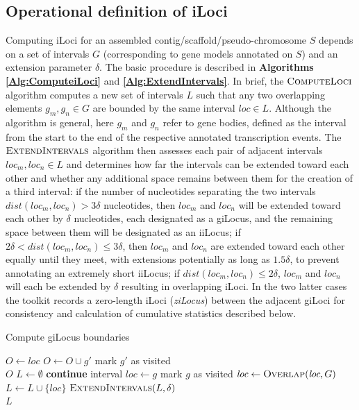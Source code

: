 \subsection{Operational definition of iLoci}
Computing iLoci for an assembled contig/scaffold/pseudo-chromosome $S$ depends on a set of intervals $G$ (corresponding to gene models annotated on $S$) and an extension parameter $\delta$.
The basic procedure is described in \textbf{Algorithms \ref{Alg:ComputeiLoci}} and \textbf{\ref{Alg:ExtendIntervals}}.
In brief, the $\textsc{ComputeLoci}$ algorithm computes a new set of intervals $L$ such that any two overlapping elements $g_m, g_n \in G$ are bounded by the same interval $loc \in L$.
Although the algorithm is general, here $g_m$ and $g_n$ refer to gene bodies, defined as the interval from the start to the end of the respective annotated transcription events.
The $\textsc{ExtendIntervals}$ algorithm then assesses each pair of adjacent intervals $loc_m, loc_n \in L$ and determines how far the intervals can be extended toward each other and whether any additional space remains between them for the creation of a third interval:
if the number of nucleotides separating the two intervals $dist(loc_m, loc_n) > 3 \delta$ nucleotides, then $loc_m$ and $loc_n$ will be extended toward each other by $\delta$ nucleotides, each designated as a giLocus, and the remaining space between them will be designated as an iiLocus;
if $2\delta < dist(loc_m, loc_n) \leq 3\delta$, then $loc_m$ and $loc_n$ are extended toward each other equally until they meet, with extensions potentially as long as $1.5\delta$, to prevent annotating an extremely short iiLocus;
if $dist(loc_m, loc_n) \leq 2\delta$, $loc_m$ and $loc_n$ will each be extended by $\delta$ resulting in overlapping iLoci.
In the two latter cases the toolkit records a zero-length iLoci (\textit{ziLocus}) between the adjacent giLoci for consistency and calculation of cumulative statistics described below.

\begin{algorithm}
\caption{Compute giLocus boundaries}
\label{Alg:ComputeiLoci}
\begin{algorithmic}[1]
\State $O \gets loc$
        \State $O \gets O \cup g'$
        \State mark $g'$ as visited
    \EndIf
\EndFor \\
\Return $O$
\EndProcedure
{}
\State $L \gets \emptyset$
        \State \textbf{continue}
    \EndIf
    \State interval $\textit{loc} \gets g$
    \State mark $g$ as visited
        \State $\textit{loc} \gets \textsc{Overlap}(\textit{loc}, G)$
    \EndWhile
    \State $L \gets L \cup \{\textit{loc}\}$
\EndFor
\State $\textsc{ExtendIntervals}(L, \delta)$ \\
\Return $L$
\EndProcedure
\end{algorithmic}
\end{algorithm}

